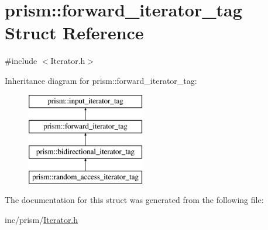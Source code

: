 \hypertarget{structprism_1_1forward__iterator__tag}{}\section{prism\+:\+:forward\+\_\+iterator\+\_\+tag Struct Reference}
\label{structprism_1_1forward__iterator__tag}


{\ttfamily \#include $<$Iterator.\+h$>$}

Inheritance diagram for prism\+:\+:forward\+\_\+iterator\+\_\+tag\+:\begin{figure}[H]
\begin{center}
\leavevmode
\includegraphics[height=4.000000cm]{structprism_1_1forward__iterator__tag}
\end{center}
\end{figure}


The documentation for this struct was generated from the following file\+:\begin{DoxyCompactItemize}
\item 
inc/prism/\hyperlink{_iterator_8h}{Iterator.\+h}\end{DoxyCompactItemize}
